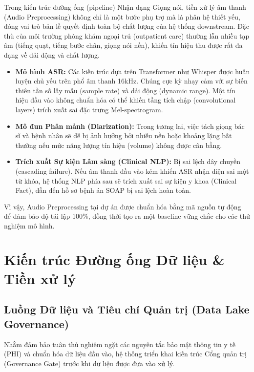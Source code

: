\documentclass[12pt,a4paper]{article}
\begin{document}
Trong kiến trúc đường ống (pipeline) Nhận dạng Giọng nói, tiền xử lý âm thanh (Audio Preprocessing) không chỉ là một bước phụ trợ mà là phân hệ thiết yếu, đóng vai trò bản lề quyết định toàn bộ chất lượng của hệ thống downstream. Đặc thù của môi trường phòng khám ngoại trú (outpatient care) thường lẫn nhiều tạp âm (tiếng quạt, tiếng bước chân, giọng nói nền), khiến tín hiệu thu được rất đa dạng về dải động và chất lượng.
\begin{itemize}[leftmargin=1.2cm]
    \item \textbf{Mô hình ASR:} Các kiến trúc dựa trên Transformer như Whisper được huấn luyện chủ yếu trên phổ âm thanh 16kHz. Chúng cực kỳ nhạy cảm với sự biến thiên tần số lấy mẫu (sample rate) và dải động (dynamic range). Một tín hiệu đầu vào không chuẩn hóa có thể khiến tầng tích chập (convolutional layers) trích xuất sai đặc trưng Mel-spectrogram.
    \item \textbf{Mô đun Phân mảnh (Diarization):} Trong tương lai, việc tách giọng bác sĩ và bệnh nhân sẽ dễ bị ảnh hưởng bởi nhiễu nền hoặc khoảng lặng bất thường nếu mức năng lượng tín hiệu (volume) không được cân bằng.
    \item \textbf{Trích xuất Sự kiện Lâm sàng (Clinical NLP):} Bị sai lệch dây chuyền (cascading failure). Nếu âm thanh đầu vào kém khiến ASR nhận diện sai một từ khóa, hệ thống NLP phía sau sẽ trích xuất sai sự kiện y khoa (Clinical Fact), dẫn đến hồ sơ bệnh án SOAP bị sai lệch hoàn toàn.
\end{itemize}
Vì vậy, Audio Preprocessing tại dự án được chuẩn hóa bằng mã nguồn tự động để đảm bảo độ tái lập 100\%, đồng thời tạo ra một baseline vững chắc cho các thử nghiệm mô hình.

\section{Kiến trúc Đường ống Dữ liệu \& Tiền xử lý}

\subsection{Luồng Dữ liệu và Tiêu chí Quản trị (Data Lake Governance)}

Nhằm đảm bảo tuân thủ nghiêm ngặt các nguyên tắc bảo mật thông tin y tế (PHI) và chuẩn hóa dữ liệu đầu vào, hệ thống triển khai kiến trúc Cổng quản trị (Governance Gate) trước khi dữ liệu được đưa vào xử lý.
\end{document}
